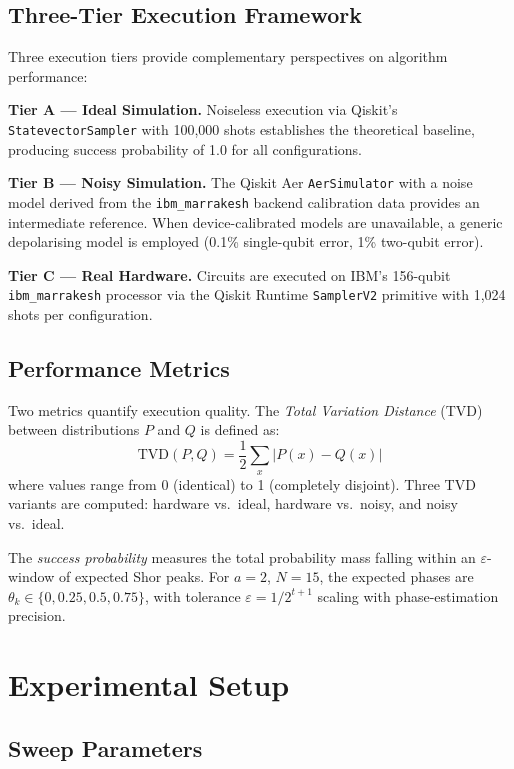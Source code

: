 \documentclass[conference]{IEEEtran}
\begin{document}
\subsection{Three-Tier Execution Framework}

Three execution tiers provide complementary perspectives on algorithm performance:

\textbf{Tier A --- Ideal Simulation.} Noiseless execution via Qiskit's \texttt{StatevectorSampler} with 100,000 shots establishes the theoretical baseline, producing success probability of 1.0 for all configurations.

\textbf{Tier B --- Noisy Simulation.} The Qiskit Aer \texttt{AerSimulator} with a noise model derived from the \texttt{ibm\_marrakesh} backend calibration data provides an intermediate reference. When device-calibrated models are unavailable, a generic depolarising model is employed (0.1\% single-qubit error, 1\% two-qubit error).

\textbf{Tier C --- Real Hardware.} Circuits are executed on IBM's 156-qubit \texttt{ibm\_marrakesh} processor via the Qiskit Runtime \texttt{SamplerV2} primitive with 1,024 shots per configuration.

\subsection{Performance Metrics}

Two metrics quantify execution quality. The \textit{Total Variation Distance} (TVD) between distributions $P$ and $Q$ is defined as:
\begin{equation}
\text{TVD}(P, Q) = \frac{1}{2} \sum_{x} |P(x) - Q(x)|
\label{eq:tvd}
\end{equation}
where values range from 0 (identical) to 1 (completely disjoint). Three TVD variants are computed: hardware vs.\ ideal, hardware vs.\ noisy, and noisy vs.\ ideal.

The \textit{success probability} measures the total probability mass falling within an $\varepsilon$-window of expected Shor peaks. For $a=2$, $N=15$, the expected phases are $\theta_k \in \{0, 0.25, 0.5, 0.75\}$, with tolerance $\varepsilon = 1/2^{t+1}$ scaling with phase-estimation precision.

\section{Experimental Setup}

\subsection{Sweep Parameters}
\end{document}
